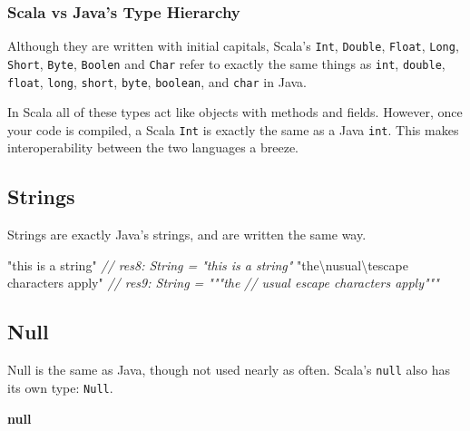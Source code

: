 \documentclass[11pt,a5paper,]{book}
\newenvironment{Shaded}{\begin{snugshade}}{\end{snugshade}}
\newcommand{\CharTok}[1]{\textcolor[rgb]{0.31,0.60,0.02}{#1}}
\newcommand{\CommentTok}[1]{\textcolor[rgb]{0.56,0.35,0.01}{\textit{#1}}}
\newcommand{\KeywordTok}[1]{\textcolor[rgb]{0.13,0.29,0.53}{\textbf{#1}}}
\newcommand{\StringTok}[1]{\textcolor[rgb]{0.31,0.60,0.02}{#1}}
\begin{document}
\hypertarget{scala-vs-javas-type-hierarchy}{%
\subsubsection*{Scala vs Java's Type
Hierarchy}\label{scala-vs-javas-type-hierarchy}}

Although they are written with initial capitals, Scala's \texttt{Int},
\texttt{Double}, \texttt{Float}, \texttt{Long}, \texttt{Short},
\texttt{Byte}, \texttt{Boolen} and \texttt{Char} refer to exactly the
same things as \texttt{int}, \texttt{double}, \texttt{float},
\texttt{long}, \texttt{short}, \texttt{byte}, \texttt{boolean}, and
\texttt{char} in Java.

In Scala all of these types act like objects with methods and fields.
However, once your code is compiled, a Scala \texttt{Int} is exactly the
same as a Java \texttt{int}. This makes interoperability between the two
languages a breeze.

\hypertarget{strings}{%
\subsection{Strings}\label{strings}}

Strings are exactly Java's strings, and are written the same way.

\begin{Shaded}
\begin{Highlighting}[]
\StringTok{"this is a string"}
\CommentTok{// res8: String = "this is a string"}
\StringTok{"the}\CharTok{\textbackslash{}n}\StringTok{usual}\CharTok{\textbackslash{}t}\StringTok{escape characters apply"}
\CommentTok{// res9: String = """the}
\CommentTok{// usual    escape characters apply"""}
\end{Highlighting}
\end{Shaded}

\hypertarget{null}{%
\subsection{Null}\label{null}}

Null is the same as Java, though not used nearly as often. Scala's
\texttt{null} also has its own type: \texttt{Null}.

\begin{Shaded}
\begin{Highlighting}[]
\KeywordTok{null}
\end{Highlighting}
\end{Shaded}
\end{document}
